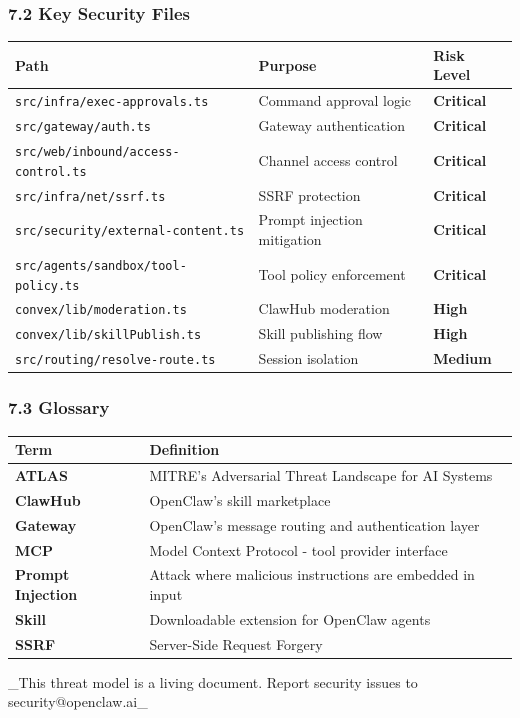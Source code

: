 \subsubsection{7.2 Key Security Files}



\begin{table}[h]
\centering
\small
\begin{tabular}{|l|l|l|}
\hline
Path & Purpose & Risk Level \\
\hline
\texttt{src/infra/exec-approvals.ts} & Command approval logic & \textbf{Critical} \\
\hline
\texttt{src/gateway/auth.ts} & Gateway authentication & \textbf{Critical} \\
\hline
\texttt{src/web/inbound/access-control.ts} & Channel access control & \textbf{Critical} \\
\hline
\texttt{src/infra/net/ssrf.ts} & SSRF protection & \textbf{Critical} \\
\hline
\texttt{src/security/external-content.ts} & Prompt injection mitigation & \textbf{Critical} \\
\hline
\texttt{src/agents/sandbox/tool-policy.ts} & Tool policy enforcement & \textbf{Critical} \\
\hline
\texttt{convex/lib/moderation.ts} & ClawHub moderation & \textbf{High} \\
\hline
\texttt{convex/lib/skillPublish.ts} & Skill publishing flow & \textbf{High} \\
\hline
\texttt{src/routing/resolve-route.ts} & Session isolation & \textbf{Medium} \\
\hline
\end{tabular}
\end{table}



\subsubsection{7.3 Glossary}



\begin{table}[h]
\centering
\small
\begin{tabular}{|l|l|}
\hline
Term & Definition \\
\hline
\textbf{ATLAS} & MITRE's Adversarial Threat Landscape for AI Systems \\
\hline
\textbf{ClawHub} & OpenClaw's skill marketplace \\
\hline
\textbf{Gateway} & OpenClaw's message routing and authentication layer \\
\hline
\textbf{MCP} & Model Context Protocol - tool provider interface \\
\hline
\textbf{Prompt Injection} & Attack where malicious instructions are embedded in input \\
\hline
\textbf{Skill} & Downloadable extension for OpenClaw agents \\
\hline
\textbf{SSRF} & Server-Side Request Forgery \\
\hline
\end{tabular}
\end{table}



\hrulefill


\_This threat model is a living document. Report security issues to security@openclaw.ai\_


\clearpage

